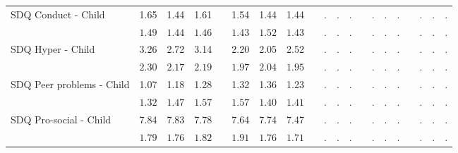 \begin{center}
{\begin{longtable}{L{5cm} c c c p{.5cm} c c c p{.5cm} c c c p{.5cm} c c c p{.5cm} c c c}
SDQ Conduct - Child & 1.65 &      1.44 &      1.61 & &      1.54 &      1.44 &      1.44 & &         . &         . &         . & &         . &         . &         . & &         . &         . &         . \\*
& $\mathit{     1.49}$ & $\mathit{     1.44}$ & $\mathit{     1.46}$ & & $\mathit{     1.43}$ & $\mathit{     1.52}$ & $\mathit{     1.43}$ & & $\mathit{        .}$ & $\mathit{        .}$ & $\mathit{        .}$ & & $\mathit{        .}$ & $\mathit{        .}$ & $\mathit{        .}$ & & $\mathit{        .}$ & $\mathit{        .}$ & $\mathit{        .}$ \\[.7em]
SDQ Hyper - Child & 3.26 &      2.72 &      3.14 & &      2.20 &      2.05 &      2.52 & &         . &         . &         . & &         . &         . &         . & &         . &         . &         . \\*
& $\mathit{     2.30}$ & $\mathit{     2.17}$ & $\mathit{     2.19}$ & & $\mathit{     1.97}$ & $\mathit{     2.04}$ & $\mathit{     1.95}$ & & $\mathit{        .}$ & $\mathit{        .}$ & $\mathit{        .}$ & & $\mathit{        .}$ & $\mathit{        .}$ & $\mathit{        .}$ & & $\mathit{        .}$ & $\mathit{        .}$ & $\mathit{        .}$ \\[.7em]
SDQ Peer problems - Child & 1.07 &      1.18 &      1.28 & &      1.32 &      1.36 &      1.23 & &         . &         . &         . & &         . &         . &         . & &         . &         . &         . \\*
& $\mathit{     1.32}$ & $\mathit{     1.47}$ & $\mathit{     1.57}$ & & $\mathit{     1.57}$ & $\mathit{     1.40}$ & $\mathit{     1.41}$ & & $\mathit{        .}$ & $\mathit{        .}$ & $\mathit{        .}$ & & $\mathit{        .}$ & $\mathit{        .}$ & $\mathit{        .}$ & & $\mathit{        .}$ & $\mathit{        .}$ & $\mathit{        .}$ \\[.7em]
SDQ Pro-social - Child & 7.84 &      7.83 &      7.78 & &      7.64 &      7.74 &      7.47 & &         . &         . &         . & &         . &         . &         . & &         . &         . &         . \\*
& $\mathit{     1.79}$ & $\mathit{     1.76}$ & $\mathit{     1.82}$ & & $\mathit{     1.91}$ & $\mathit{     1.76}$ & $\mathit{     1.71}$ & & $\mathit{        .}$ & $\mathit{        .}$ & $\mathit{        .}$ & & $\mathit{        .}$ & $\mathit{        .}$ & $\mathit{        .}$ & & $\mathit{        .}$ & $\mathit{        .}$ & $\mathit{        .}$ \\[.7em]

\end{longtable}}
\end{center}
